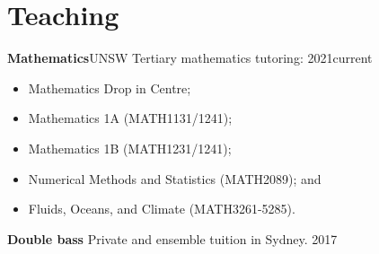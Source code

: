 
\section{Teaching}



\textbf{Mathematics}\hfill UNSW
\newline
Tertiary mathematics tutoring: \hfill 2021\textendash current
\begin{itemize}
    \item Mathematics Drop in Centre;
    \item Mathematics 1A (MATH1131/1241);
    \item Mathematics 1B (MATH1231/1241);
    \item Numerical Methods and Statistics (MATH2089); and
    \item Fluids, Oceans, and Climate (MATH3261-5285).
\end{itemize}

\textbf{Double bass}
\newline
Private and ensemble tuition in Sydney. \hfill 2017
